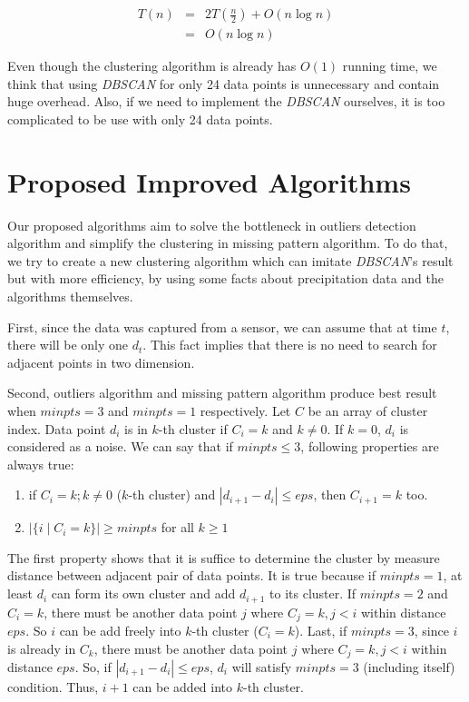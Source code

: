 \documentclass[conference]{IEEEtran}
\begin{document}
\[
\begin{array}{lcl}
T(n) & = & 2T(\frac{n}{2}) + O(n \log{n})\\
     & = & O(n \log{n})
\end{array}
\]

Even though the clustering algorithm is already has $O(1)$ running time, we think that using \textit{DBSCAN} for only 24 data points is unnecessary and contain huge overhead. Also, if we need to implement the \textit{DBSCAN} ourselves, it is too complicated to be use with only 24 data points.

\section{Proposed Improved Algorithms} \label{sec:propose}

Our proposed algorithms aim to solve the bottleneck in outliers detection algorithm and simplify the clustering in missing pattern algorithm. To do that, we try to create a new clustering algorithm which can imitate \textit{DBSCAN}'s result but with more efficiency, by using some facts about precipitation data and the algorithms themselves.

First, since the data was captured from a sensor, we can assume that at time $t$, there will be only one $d_{t}$. This fact implies that there is no need to search for adjacent points in two dimension.

Second, outliers algorithm and missing pattern algorithm produce best result when $\textit{minpts} = 3$ and $\textit{minpts} = 1$ respectively. Let $C$ be an array of cluster index. Data point $d_{i}$ is in $k$-th cluster if $C_{i} = k$ and $k \neq 0$. If $k = 0$, $d_{i}$ is considered as a noise. We can say that if $\textit{minpts} \le 3$, following properties are always true:

\begin{enumerate}
	\item if $C_{i} = k; k \neq 0$ (\textit{$k$}-th cluster) and $|d_{i+1} - d_{i}| \le \textit{eps}$, then $C_{i+1} = k$ too.
	\item $|\{i \mid C_{i} = k\}| \ge \textit{minpts}$ for all $k \ge 1$ 
\end{enumerate}

The first property shows that it is suffice to determine the cluster by measure distance between adjacent pair of data points. It is true because if $\textit{minpts} = 1$, at least $d_{i}$ can form its own cluster and add $d_{i+1}$ to its cluster. If $\textit{minpts} = 2$ and $C_{i} = k$, there must be another data point $j$ where $C_{j} = k, j < i$ within distance $\textit{eps}$. So $i$ can be add freely into $k$-th cluster ($C_{i} = k$). Last, if $\textit{minpts} = 3$, since $i$ is already in $C_{k}$, there must be another data point $j $ where $C_{j} = k, j < i$ within distance $\textit{eps}$. So, if $|d_{i+1} - d_{i}| \le \textit{eps}$, $d_{i}$ will satisfy $\textit{minpts} = 3$ (including itself) condition. Thus, $i+1$ can be added into $k$-th cluster.
\end{document}
